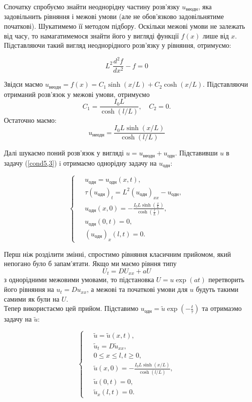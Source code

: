 Спочатку спробуємо знайти неоднорідну частину розв'язку $u_{\text{неодн}}$, яка задовільнить рівняння і межові умови (але не обов'язково задовільнятиме початкові). Шукатимемо її методом підбору. Оскільки межові умови не залежать від часу, то намагатимемося знайти його у вигляді функції $f(x)$ лише від $x$. Підставляючи такий вигляд неоднорідного розв'язку у рівняння, отримуємо:

\begin{equation*}
L^2\frac{d^2f}{dx^2} - f = 0
\end{equation*}

Звідси маємо $u_{\text{неодн}} = f(x) = C_1\sinh(x/L) + C_2\cosh(x/L)$. Підставляючи отриманий розв'язок у межові умови, отримуємо \[C_1 = \frac{I_0L}{\cosh(l/L)}, \quad C_2 = 0.\] Остаточно маємо:
\begin{equation}
u_{\text{неодн}}=\frac{I_0L\sinh(x/L)}{\cosh(l/L)}
\end{equation}

Далі шукаємо поний розв'язок у вигляді $u = u_{\text{неодн}} + u_{\text{одн}}$. Підставивши $u$ в задачу (\ref{cond5,3}) i отримаємо однорідну задачу на $u_{\text{одн}}$:

\begin{equation*} 
    \left\{ \begin{aligned}
            \;&u_{\text{одн}} = u_{\text{одн}}(x,t), \\
            &\tau (u_{\text{одн}})_t = L^2(u_{\text{одн}})_{xx} - u_{\text{одн}}, \\
            &u_{\text{одн}}(x,0) = -\frac{I_0L\sinh{(\frac{x}{L})}}{\cosh{(\frac{l}{L})}},\\
            &u_{\text{одн}}(0,t) = 0, \\
            &(u_{\text{одн}})_x(l,t) = 0. 
    \end{aligned} \right.
\end{equation*}

Перш ніж розділити змінні, спростимо рівняння класичним прийомом, який непогано було б запам'ятати. Якщо ми маємо рівння типу \[U_t = D U_{xx} + aU\] з однорідними межовими умовами, то підстановка $U = u\exp(at)$ перетворить його рівняння на $u_t = D u_{xx}$, а межові та початкові умови для $u$ будуть такими самими як були на $U$.\\

Тепер використаємо цей прийом. Підставимо $u_{\text{одн}} = \tilde{u}\exp(-\frac{t}{\tau})$ та отримаэмо задачу на $\tilde{u}$:

\begin{equation} \label{new-cond5,3}
    \left\{ \begin{aligned}
            \;&\tilde{u} = \tilde{u}(x,t), \\
            &\tilde{u}_t = D \tilde{u}_{xx}, \\
            &0 \leq x \leq l, t \geq 0, \\
            &\tilde{u}(x,0) = -\frac{I_0L \sinh(x/L)}{\cosh(l/L)},\\
            &\tilde{u}(0,t) = 0, \\
            &\tilde{u}_x(l,t) = 0. 
    \end{aligned} \right.
\end{equation}

